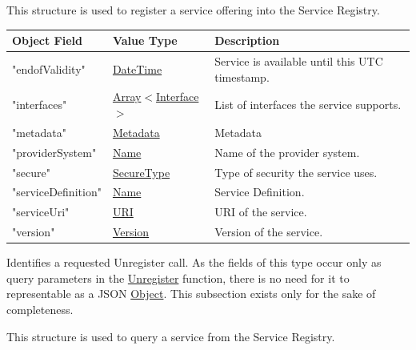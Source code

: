 \documentclass[a4paper]{arrowhead}
\newcommand{\fref}[1]{{\textcolor{ArrowheadBlue}{\hyperref[sec:functions:#1]{#1}}}}
\newcommand{\pref}[1]{{\textcolor{ArrowheadGrey}{\hyperref[sec:model:primitives:#1]{#1}}}}
\begin{document}

This structure is used to register a service offering into the Service Registry.

\begin{table}[ht!]
\begin{tabularx}{\textwidth}{| p{4.25cm} | p{3.5cm} | X |} \hline
\rowcolor{gray!33} Object Field & Value Type      & Description \\ \hline
"endofValidity"                 & \pref{DateTime} & Service is available until this UTC timestamp. \\ \hline
"interfaces"                   & \pref{Array}$<$\pref{Interface}$>$     & List of interfaces the service supports. \\ \hline
"metadata"                  & \pref{Metadata}     & Metadata \\ \hline
"providerSystem"                    & \pref{Name} & Name of the provider system. \\ \hline
"secure"                    &\pref{SecureType}  & Type of security the service uses. \\ \hline
"serviceDefinition"         &\pref{Name}        & Service Definition. \\ \hline
"serviceUri"                &\pref{URI}         & URI of the service. \\ \hline
"version"                   &\pref{Version}     & Version of the service. \\ \hline
\end{tabularx}
\end{table}


Identifies a requested Unregister call.
As the fields of this type occur only as query parameters in the \fref{Unregister} function, there is no need for it to representable as a JSON \pref{Object}.
This subsection exists only for the sake of completeness.


This structure is used to query a service from the Service Registry.
\end{document}
